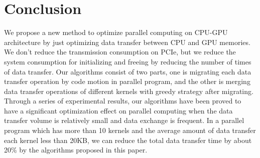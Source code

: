 \documentclass[10pt,conference]{IEEEtran}
\begin{document}
\section{Conclusion}
We propose a new method to optimize parallel computing on CPU-GPU architecture by just optimizing data transfer between CPU and GPU memories. We don't reduce the transmission consumption on PCIe, but we reduce the system consumption for initializing and freeing by reducing the number of times of data transfer. Our algorithms consist of two parts, one is migrating each data transfer operation by code motion in parallel program, and the other is merging data transfer operations of different kernels with greedy strategy after migrating. Through a series of experimental results, our algorithms have been proved to have a significant optimization effect on parallel computing when the data transfer volume is relatively small and data exchange is frequent. In a parallel program which has more than 10 kernels and the average amount of data transfer each kernel less than 20KB, we can reduce the total data transfer time by about 20\% by the algorithms proposed in this paper.





%


\end{document}
